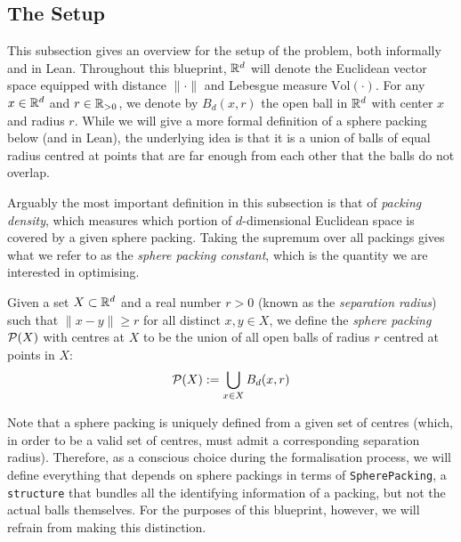 \subsection{The Setup}

This subsection gives an overview for the setup of the problem, both informally and in Lean. Throughout this blueprint, $\mathbb{R}^d$ will denote the Euclidean vector space equipped with distance $\|\cdot\|$ and Lebesgue measure $\mathrm{Vol}(\cdot)$. For any $x\in\mathbb{R}^d$ and $r\in\mathbb{R}_{>0}$, we denote by $B_d(x,r)$ the open ball in $\mathbb{R}^d$ with center $x$ and radius $r$. While we will give a more formal definition of a sphere packing below (and in Lean), the underlying idea is that it is a union of balls of equal radius centred at points that are far enough from each other that the balls do not overlap.

Arguably the most important definition in this subsection is that of \emph{packing density}, which measures which portion of $d$-dimensional Euclidean space is covered by a given sphere packing. Taking the supremum over all packings gives what we refer to as the \emph{sphere packing constant}, which is the quantity we are interested in optimising.

\begin{definition}\label{SpherePacking.balls}\leanok  %
  Given a set $X \subset \mathbb{R}^d$ and a real number $r > 0$ (known as the \emph{separation radius}) such that $\|x - y\| \geq r$ for all distinct $x, y \in X$, we define the \emph{sphere packing} $\mathcal{P}(X)$ with centres at $X$ to be the union of all open balls of radius $r$ centred at points in $X$:
  \[
    \mathcal{P}(X) := \bigcup_{x \in X} B_d(x, r)
  \]
\end{definition}

\begin{remark}\label{SpherePacking}\leanok
  Note that a sphere packing is uniquely defined from a given set of centres (which, in order to be a valid set of centres, must admit a corresponding separation radius). Therefore, as a conscious choice during the formalisation process, we will define everything that depends on sphere packings in terms of \verb|SpherePacking|, a \verb|structure| that bundles all the identifying information of a packing, but not the actual balls themselves. For the purposes of this blueprint, however, we will refrain from making this distinction.
\end{remark}

